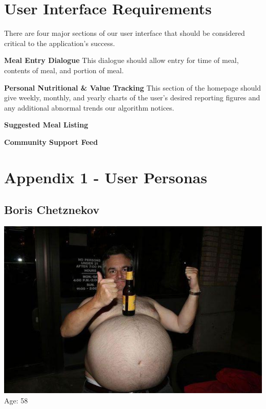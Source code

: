 \documentclass[a4paper,12pt]{article}
\begin{document}
\section{User Interface Requirements}
There are four major sections of our user interface that should be considered critical to the application's success.
\begin{list}{•}{•}
\item \textbf{Meal Entry Dialogue}  This dialogue should allow entry for time of meal, contents of meal, and portion of meal.
\item \textbf{Personal Nutritional \& Value Tracking}  This section of the homepage should give weekly, monthly, and yearly charts of the user's desired reporting figures and any additional abnormal trends our algorithm notices.
\item \textbf{Suggested Meal Listing}
\item \textbf{Community Support Feed}
\end{list}
\newpage 
\section{Appendix 1 - User Personas}
\subsection{Boris Chetznekov}
\includegraphics[scale=0.3]{Boris.jpg}
Age: 58\\
\end{document}
